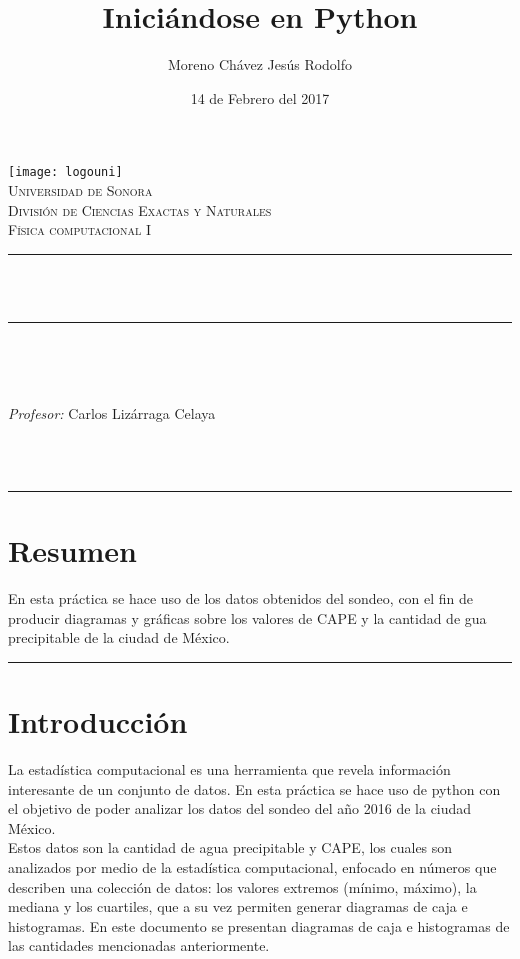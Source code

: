 \documentclass[12pt]{article}
\title{Iniciándose en Python}		%
\author{\centering Moreno Chávez Jesús Rodolfo}											%
\date{14 de Febrero del 2017} %
\makeatletter
\let\thetitle\@title
\let\theauthor\@author
\let\thedate\@date
\makeatother
\begin{document}

\begin{titlepage}
	\centering
    \vspace*{0.5 cm}
    \texttt{[image: logouni]}\\[0.5 cm]	%
    \textsc{\Large Universidad de Sonora}\\[1.0 cm]	%
	\textsc{\Large División de Ciencias Exactas y Naturales}\\[0.5 cm]				%
	\textsc{\large Física computacional I}\\[0.5 cm]				%
	\rule{\linewidth}{0.2 mm} \\[0.4 cm]
	{ \huge \bfseries \thetitle}\\
	\rule{\linewidth}{0.2 mm} \\[0.5 cm]
	
	\begin{minipage}{\textwidth}
		\begin{flushleft} 
			\emph{\Large} \large \\
			\theauthor
			\end{flushleft}
	
		\begin{flushleft} 
			\emph{\Large Profesor:} \large \centering Carlos Lizárraga Celaya 	
			\end{flushleft}
	\end{minipage}\\[1 cm]
	{\large \thedate}\\[2 cm]
 
	\vfill
	
\end{titlepage}
\newpage
\hrule 
\section*{Resumen}
En esta práctica se hace uso de los datos obtenidos del sondeo, con el fin de producir diagramas y gráficas sobre los valores de CAPE y la cantidad de gua precipitable de la ciudad de México.
\vspace{0.5 cm}
\hrule
\vspace{0.9 cm}
\section*{Introducción}
La estadística computacional es una herramienta que revela información interesante de un conjunto de datos.
En esta práctica se hace uso de python con el objetivo de poder analizar los datos del sondeo del año 2016 de la ciudad México.  \\ Estos datos son la cantidad de agua precipitable y CAPE, los cuales son analizados por medio 
de la estadística computacional, enfocado en números que describen una colección de datos: los valores extremos (mínimo, máximo), la mediana y los cuartiles, que a su vez permiten generar diagramas de caja e histogramas. En este documento se presentan diagramas de caja e histogramas de las cantidades mencionadas anteriormente.
\end{document}
